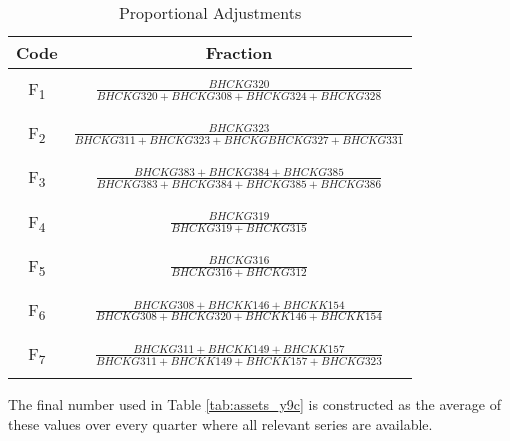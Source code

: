 \begin{table}[H]
\caption{Proportional Adjustments}
\label{tab:ratios_y9c} 
\begin{centering}
\begin{tabular}{|c|c|}
\hline 
Code  & Fraction\tabularnewline
\hline 
\hline 
 & \tabularnewline
F\textsubscript{1}  & $\frac{BHCKG320}{BHCKG320+BHCKG308+BHCKG324+BHCKG328}$\tabularnewline
 & \tabularnewline
\hline 
 & \tabularnewline
F\textsubscript{2}  & $\frac{BHCKG323}{BHCKG311+BHCKG323+BHCKGBHCKG327+BHCKG331}$\tabularnewline
 & \tabularnewline
\hline 
 & \tabularnewline
F\textsubscript{3}  & $\frac{BHCKG383+BHCKG384+BHCKG385}{BHCKG383+BHCKG384+BHCKG385+BHCKG386}$\tabularnewline
 & \tabularnewline
\hline 
 & \tabularnewline
F\textsubscript{4}  & $\frac{BHCKG319}{BHCKG319+BHCKG315}$\tabularnewline
 & \tabularnewline
\hline 
 & \tabularnewline
F\textsubscript{5}  & $\frac{BHCKG316}{BHCKG316+BHCKG312}$\tabularnewline
 & \tabularnewline
\hline 
 & \tabularnewline
F\textsubscript{6}  & $\frac{BHCKG308+BHCKK146+BHCKK154}{BHCKG308+BHCKG320+BHCKK146+BHCKK154}$\tabularnewline
 & \tabularnewline
\hline 
 & \tabularnewline
F\textsubscript{7}  & $\frac{BHCKG311+BHCKK149+BHCKK157}{BHCKG311+BHCKK149+BHCKK157+BHCKG323}$\tabularnewline
 & \tabularnewline
\hline 
\end{tabular}
\par\end{centering}
{The final number used in Table \ref{tab:assets_y9c} is constructed as the average of
these values over every quarter where all relevant series are available.} 
\end{table}

\newpage

